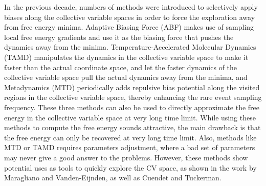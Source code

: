 \begin{spacing}{2.0}
    In the previous decade, numbers of methods were introduced to selectively apply biases along the collective variable spaces in order to force 
    the exploration away from free energy minima. Adaptive Biasing Force (ABF) \cite{P-JChemPhys-2001-v115-Darve,P-JChemPhys-2008-v128-Darve} 
    makes use of sampling local free energy gradients and use it as the biasing force that pushes the dynamics away from the minima. 
    Temperature-Accelerated Molecular Dynamics (TAMD) \cite{P-ChemPhysLett-2006-v426-Maragliano,P-JChemPhys-2008-v128-Maragliano} manipulates the 
    dynamics in the collective variable space to make it faster than the actual coordinate space, and let the faster dynamics of the collective 
    variable space pull the actual dynamics away from the minima, and Metadynamics (MTD) \cite{P-PNAS-2002-v99-Laio,P-WIRES-2011-v1-Barducci} 
    periodically adds repulsive bias potential along the visited regions in the 
    collective variable space, thereby enhancing the rare event sampling frequency. These three methods can also be used to directly approximate 
    the free energy in the collective variable space at very long time limit. While using these methods to compute the free energy sounds attractive, 
    the main drawback is that the free energy can only be recovered at very long time limit.  Also, methods like 
    MTD or TAMD requires parameters adjustment, where a bad set of parameters may never give a good answer to the problems. However, these methods 
    show potential uses as tools to quickly explore the CV space, as shown in the work by Maragliano and Vanden-Eijnden, 
    \cite{P-JChemPhys-2008-v128-Maragliano} as well as Cuendet and Tuckerman. \cite{P-JCTC-2014-v10-Cuendet}


\end{spacing}
